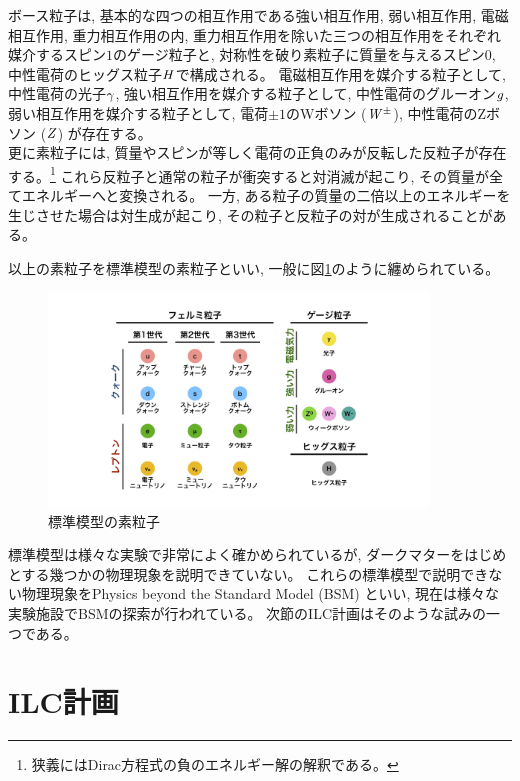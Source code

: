 ボース粒子は, 基本的な四つの相互作用である強い相互作用, 弱い相互作用, 電磁相互作用, 重力相互作用の内, 重力相互作用を除いた三つの相互作用をそれぞれ媒介するスピン$1$のゲージ粒子と, 対称性を破り素粒子に質量を与えるスピン$0$, 中性電荷のヒッグス粒子$\it H$で構成される。
電磁相互作用を媒介する粒子として, 中性電荷の光子$\it \gamma$, 強い相互作用を媒介する粒子として, 中性電荷のグルーオン$\it g$, 弱い相互作用を媒介する粒子として, 電荷$\pm 1$のWボソン ($\it W^{\pm}$), 中性電荷のZボソン ($\it Z$) が存在する。\\

更に素粒子には, 質量やスピンが等しく電荷の正負のみが反転した反粒子が存在する。\footnote{狭義にはDirac方程式の負のエネルギー解の解釈である。}
これら反粒子と通常の粒子が衝突すると対消滅が起こり, その質量が全てエネルギーへと変換される。
一方, ある粒子の質量の二倍以上のエネルギーを生じさせた場合は対生成が起こり, その粒子と反粒子の対が生成されることがある。

以上の素粒子を標準模型の素粒子といい, 一般に図\ref{1SMParticle}のように纏められている。

\begin{figure}[htbp]
 \centering
 \includegraphics[width=0.9\textwidth]{Figure/1Introduction/1SMParticle.png}
 \caption{標準模型の素粒子}
 \label{1SMParticle}
\end{figure}

標準模型は様々な実験で非常によく確かめられているが, ダークマターをはじめとする幾つかの物理現象を説明できていない。
これらの標準模型で説明できない物理現象をPhysics beyond the Standard Model (BSM) といい, 現在は様々な実験施設でBSMの探索が行われている。
次節のILC計画はそのような試みの一つである。


\section{ILC計画} \label{Intro:InternationalLinearColliderProject}

